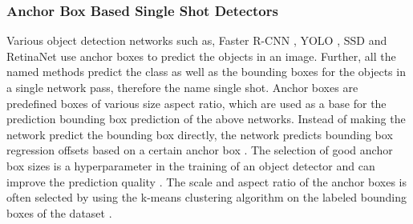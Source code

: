 




\subsubsection{Anchor Box Based Single Shot Detectors}

Various object detection networks such as, Faster \ac{R-CNN} \cite{faster_rcnn}, \ac{YOLO} \cite{yolov1}, \ac{SSD} \cite{ssd} and RetinaNet \cite{focalloss} use anchor boxes to predict the objects in an image.
Further, all the named methods predict the class as well as the bounding boxes for the objects in a single network pass, therefore the name single shot.
Anchor boxes are predefined boxes of various size aspect ratio, which are used as a base for the prediction bounding box prediction of the above networks.
Instead of making the network predict the bounding box directly, the network predicts bounding box regression offsets based on a certain anchor box \cite{yolov3}.
The selection of good anchor box sizes is a hyperparameter in the training of an object detector and can improve the prediction quality \cite{faster_rcnn}.
The scale and aspect ratio of the anchor boxes is often selected by using the k-means clustering algorithm on the labeled bounding boxes of the dataset \cite{yolov2}.


